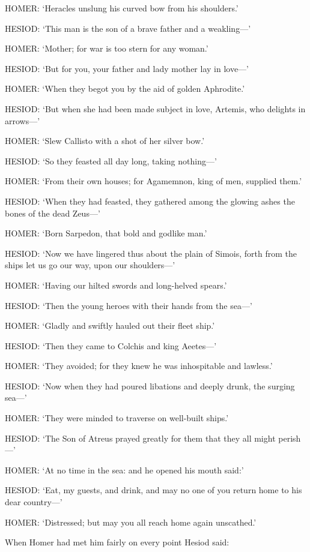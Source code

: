 HOMER: ‘Heracles unslung his curved bow from his shoulders.’

HESIOD: ‘This man is the son of a brave father and a
weakling—’

HOMER: ‘Mother; for war is too stern for any woman.’

HESIOD: ‘But for you, your father and lady mother lay in
love—’

HOMER: ‘When they begot you by the aid of golden Aphrodite.’

HESIOD: ‘But when she had been made subject in love, Artemis, who
delights in arrows—’

HOMER: ‘Slew Callisto with a shot of her silver bow.’

HESIOD: ‘So they feasted all day long, taking nothing—’

HOMER: ‘From their own houses; for Agamemnon, king of men, supplied
them.’

HESIOD: ‘When they had feasted, they gathered among the glowing ashes the
bones of the dead Zeus—’

HOMER: ‘Born Sarpedon, that bold and godlike man.’

HESIOD: ‘Now we have lingered thus about the plain of Simois, forth from
the ships let us go our way, upon our shoulders—’

HOMER: ‘Having our hilted swords and long-helved spears.’

HESIOD: ‘Then the young heroes with their hands from the
sea—’

HOMER: ‘Gladly and swiftly hauled out their fleet ship.’

HESIOD: ‘Then they came to Colchis and king Aeetes—’

HOMER: ‘They avoided; for they knew he was inhospitable and
lawless.’

HESIOD: ‘Now when they had poured libations and deeply drunk, the surging
sea—’

HOMER: ‘They were minded to traverse on well-built ships.’

HESIOD: ‘The Son of Atreus prayed greatly for them that they all might
perish—’

HOMER: ‘At no time in the sea: and he opened his mouth said:’

HESIOD: ‘Eat, my guests, and drink, and may no one of you return home to
his dear country—’

HOMER: ‘Distressed; but may you all reach home again unscathed.’

When Homer had met him fairly on every point Hesiod said:

